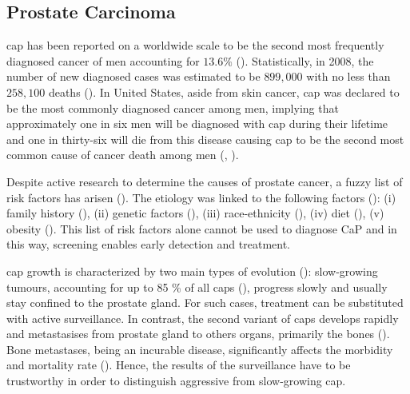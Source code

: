 
\subsection{Prostate Carcinoma}
\ac{cap} has been reported on a worldwide scale to be the second most frequently diagnosed cancer of men accounting for $13.6 \%$ (\cite{Ferlay2010}). Statistically, in 2008, the number of new diagnosed cases was estimated to be $899,000$ with no less than $258,100$ deaths (\cite{Ferlay2010}). In United States, aside from skin cancer, \ac{cap} was declared to be the most commonly diagnosed cancer among men, implying that approximately one in six men will be diagnosed with \ac{cap} during their lifetime and one in thirty-six will die from this disease causing \ac{cap} to be the second most common cause of cancer death among men (\cite{Siegel2013}, \cite{Society2013}).

Despite active research to determine the causes of prostate cancer, a fuzzy list of risk factors has arisen (\cite{Society2010}). The etiology was linked to the following factors (\cite{Society2010}): (i) family history (\cite{Giovannucci2007,Steinberg1990}), (ii) genetic factors (\cite{Freedman2006,Amundadottir2006,Agalliu2009}), (iii) race-ethnicity (\cite{Giovannucci2007,Hoffman2001}), (iv) diet (\cite{Giovannucci2007,Ma2009,Alexander2010}), (v) obesity (\cite{Giovannucci2007,Rodriguez2007}). This list of risk factors alone cannot be used to diagnose CaP and in this way, screening enables early detection and treatment.

\ac{cap} growth is characterized by two main types of evolution (\cite{Strum2005}): slow-growing tumours, accounting for up to 85 \% of all \acp{cap} (\cite{Lu-Yao2009}), progress slowly and usually stay confined to the prostate gland. For such cases, treatment can be substituted with active surveillance. In contrast, the second variant of \acp{cap} develops rapidly and metastasises from prostate gland to others organs, primarily the bones (\cite{Oster2013}). Bone metastases, being an incurable disease, significantly affects the morbidity and mortality rate (\cite{Ye2007}). Hence, the  results of the surveillance have to be trustworthy in order to distinguish aggressive from slow-growing \ac{cap}.

